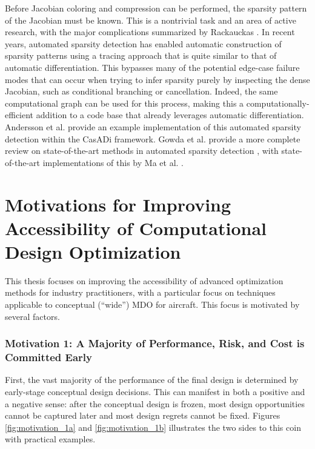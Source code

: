 Before Jacobian coloring and compression can be performed, the sparsity pattern of the Jacobian must be known. This is a nontrivial task and an area of active research, with the major complications summarized by Rackauckas \cite{rackauckas_generalizing_2021}. In recent years, automated sparsity detection has enabled automatic construction of sparsity patterns using a tracing approach that is quite similar to that of automatic differentiation. This bypasses many of the potential edge-case failure modes that can occur when trying to infer sparsity purely by inspecting the dense Jacobian, such as conditional branching or cancellation. Indeed, the same computational graph can be used for this process, making this a computationally-efficient addition to a code base that already leverages automatic differentiation. Andersson et al. \cite{casadi} provide an example implementation of this automated sparsity detection within the CasADi framework. Gowda et al. provide a more complete review on state-of-the-art methods in automated sparsity detection \cite{gowda_sparsity_2019}, with state-of-the-art implementations of this by Ma et al. \cite{ma_modelingtoolkit_2021}.

\afterpage{\FloatBarrier}


\section{Motivations for Improving Accessibility of Computational Design Optimization}
\label{sec:motivation}

This thesis focuses on improving the accessibility of advanced optimization methods for industry practitioners, with a particular focus on techniques applicable to conceptual (``wide'') MDO for aircraft. This focus is motivated by several factors.

\subsubsection*{Motivation 1: A Majority of Performance, Risk, and Cost is Committed Early}

First, the vast majority of the performance of the final design is determined by early-stage conceptual design decisions. This can manifest in both a positive and a negative sense: after the conceptual design is frozen, most design opportunities cannot be captured later and most design regrets cannot be fixed. Figures \ref{fig:motivation_1a} and \ref{fig:motivation_1b} illustrates the two sides to this coin with practical examples.

